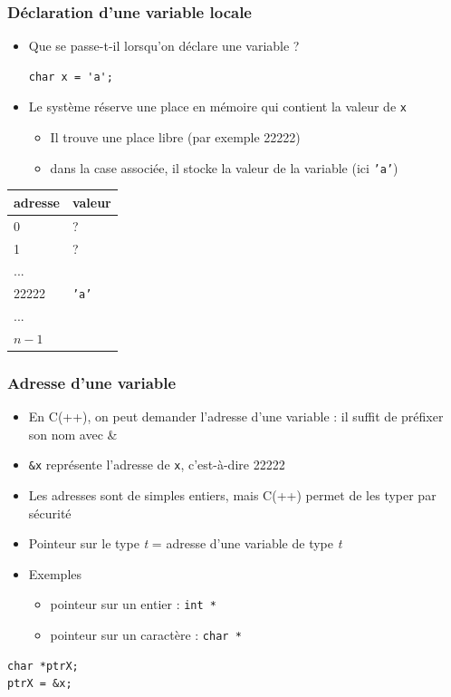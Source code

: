 \begin{frame}[fragile]
\frametitle{Déclaration d'une variable locale}
\begin{itemize}
\item Que se passe-t-il lorsqu'on déclare une variable ?
\begin{lstlisting}
char x = 'a';
\end{lstlisting}
\item Le système réserve une place en mémoire qui contient la valeur de \texttt{x}
\begin{itemize}
\item Il trouve une place libre (par exemple 22222)
\item dans la case associée, il stocke la valeur de la variable (ici \texttt{'a'})
\end{itemize}
\end{itemize}
\begin{center}
\begin{tabular}{|l|l|}
\hline \textbf{adresse} & \textbf{valeur} \\
\hline 0 & ? \\
1 & ? \\
... & \\
22222 & \texttt{'a'} \\
... & \\
$n-1$ & \\
\hline
\end{tabular}
\end{center}
\end{frame}

\begin{frame}[fragile]
\frametitle{Adresse d'une variable}
\begin{itemize}
\item En C(++), on peut demander l'adresse d'une variable : il suffit de préfixer son nom avec \&
\item \texttt{\&x} représente l'adresse de \texttt{x}, c'est-à-dire 22222
\item Les adresses sont de simples entiers, mais C(++) permet de les typer par sécurité
\item Pointeur sur le type \textit{t} = adresse d'une variable de type \textit{t}
\item Exemples
\begin{itemize}
\item pointeur sur un entier : \texttt{int *}
\item pointeur sur un caractère : \texttt{char *}
\end{itemize}
\end{itemize}
\begin{lstlisting}
char *ptrX;
ptrX = &x;
\end{lstlisting}
\end{frame}

